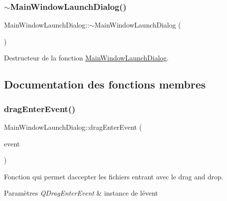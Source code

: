 \subsubsection{\texorpdfstring{$\sim$\+Main\+Window\+Launch\+Dialog()}{~MainWindowLaunchDialog()}}
{\footnotesize\ttfamily Main\+Window\+Launch\+Dialog\+::$\sim$\+Main\+Window\+Launch\+Dialog (\begin{DoxyParamCaption}{ }\end{DoxyParamCaption})}



Destructeur de la fonction \hyperlink{classMainWindowLaunchDialog}{Main\+Window\+Launch\+Dialog}. 



\subsection{Documentation des fonctions membres}
\mbox{\label{classMainWindowLaunchDialog_aaf393173ffd6c63b2c4d5bdd48b8ddb4}} 
\subsubsection{\texorpdfstring{drag\+Enter\+Event()}{dragEnterEvent()}}
{\footnotesize\ttfamily Main\+Window\+Launch\+Dialog\+::drag\+Enter\+Event (\begin{DoxyParamCaption}\item[{Q\+Drag\+Enter\+Event $\ast$}]{event }\end{DoxyParamCaption})\hspace{0.3cm}{\ttfamily [private]}}



Fonction qui permet d\textquotesingle{}accepter les fichiers entrant avec le drag and drop. 


\begin{DoxyParams}{Paramètres}
{\em Q\+Drag\+Enter\+Event} & instance de l\textquotesingle{}évent \\
\hline
\end{DoxyParams}
\mbox{\label{classMainWindowLaunchDialog_a6b292183d418fe79b79225d9a35bd3dd}} 
